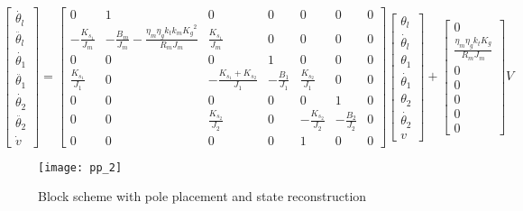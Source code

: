 \begin{equation}
	\begin{bmatrix}
		\dot{\theta_l} \\
		\ddot{\theta_l} \\
		\dot{\theta_1} \\
		\ddot{\theta_1} \\
		\dot{\theta_2} \\
		\ddot{\theta_2} \\
		\dot{v}
	\end{bmatrix}
	=
	\begin{bmatrix}
		0 &1 & 0 & 0 & 0 & 0 & 0 \\
		-\frac{K_{s_1}}{J_m} & -\frac{B_m}{J_m}-\frac{\eta_m \eta_g k_t k_m {K_g}^2}{R_m J_m}  & \frac{K_{s_1}}{J_m} & 0 & 0 & 0 & 0 \\
		0 & 0 & 0 & 1 & 0 & 0 & 0\\
		\frac{K_{s_1}}{J_1} & 0 & -\frac{K_{s_1}+K_{s_2}}{J_1} & -\frac{B_1}{J_1} & \frac{K_{s_2}}{J_1} & 0 & 0\\
		0 & 0 & 0 & 0 & 0 & 1 & 0 \\
		0 & 0 & \frac{K_{s_2}}{J_2} & 0 & -\frac{K_{s_2}}{J_2} & -\frac{B_2}{J_2} & 0 \\
		0 & 0 & 0 & 0 & 1 & 0 & 0
	\end{bmatrix}
	\begin{bmatrix}
		\theta_l \\
		\dot{\theta_l} \\
		\theta_1 \\
		\dot{\theta_1} \\
		\theta_2 \\
		\dot{\theta_2} \\
		v 
	\end{bmatrix}
	+
	\begin{bmatrix}
		0 \\
		\frac{\eta_m \eta_g k_t K_g}{R_m J_m} \\
		0 \\
		0 \\
		0 \\
		0 \\
		0 
	\end{bmatrix}
	V
\end{equation}


\begin{figure*}[h]
	\centering
	\texttt{[image: pp\_2]}
	\caption{Block scheme with pole placement and state reconstruction}
\end{figure*}

